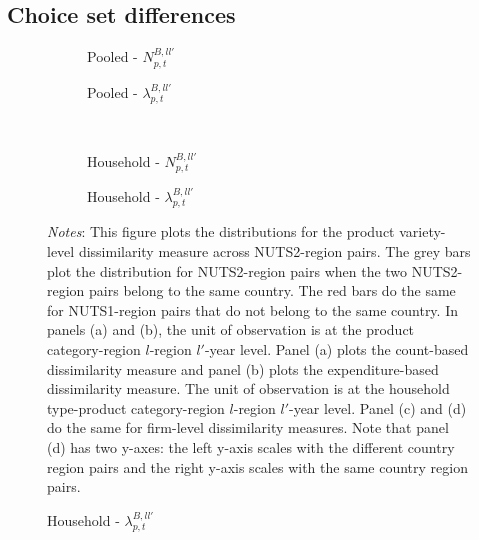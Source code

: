  \subsection{Choice set differences}
 \begin{figure}[H]
    \centering
    \caption{Choice set differences: All product varieties}
    \label{fig: app_redform_bar}
    \begin{subfigure}[t]{.49\textwidth}
         \centering
         \caption{Pooled - $N^{B,ll'}_{p,t}$}
         \scalebox{0.45}{}
     \end{subfigure}
     \begin{subfigure}[t]{.49\textwidth}
         \centering
         \caption{Pooled - $\lambda^{B,ll'}_{p,t}$}
         \scalebox{0.45}{}
     \end{subfigure}\\
     \begin{subfigure}[t]{.49\textwidth}
         \centering
         \caption{Household - $N^{B,ll'}_{p,t}$}
         \scalebox{0.45}{}
     \end{subfigure}
     \begin{subfigure}[t]{.49\textwidth}
         \centering
         \caption{Household - $\lambda^{B,ll'}_{p,t}$}
         \scalebox{0.45}{}
     \end{subfigure}
     \parbox{\textwidth}{
        \begin{spacing}{1} 
            {\footnotesize 
            \textit{Notes}: This figure plots the distributions for the product variety-level dissimilarity measure across NUTS2-region pairs. The grey bars plot the distribution for NUTS2-region pairs when the two NUTS2-region pairs belong to the same country. The red bars do the same for NUTS1-region pairs that do not belong to the same country. In panels (a) and (b), the unit of observation is at the product category-region $l$-region $l'$-year level. Panel (a) plots the count-based dissimilarity measure and panel (b) plots the expenditure-based dissimilarity measure. The unit of observation is at the household type-product category-region $l$-region $l'$-year level. Panel (c) and (d) do the same for firm-level dissimilarity measures. Note that panel (d) has two y-axes: the left y-axis scales with the different country region pairs and the right y-axis scales with the same country region pairs.}
        \end{spacing}}
 \end{figure} 

